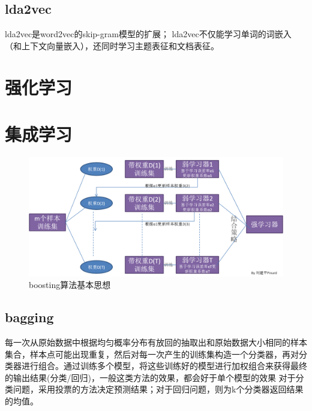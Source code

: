 \documentclass[UTF8]{article}%
\begin{document}
	\subsection{lda2vec}
	lda2vec是word2vec的skip-gram模型的扩展；
	lda2vec不仅能学习单词的词嵌入（和上下文向量嵌入），还同时学习主题表征和文档表征。
	
	\newpage
	\section{强化学习}
	\newpage
	\section{集成学习}
		\begin{figure}[h]%
			\centering  %
			\includegraphics[width=1.0\linewidth]{figures/adaboost}  %
			\caption{boosting算法基本思想}  %
			\label{boosting}   %
		\end{figure}
		\subsection{bagging}
		每一次从原始数据中根据均匀概率分布有放回的抽取出和原始数据大小相同的样本集合，样本点可能出现重复，然后对每一次产生的训练集构造一个分类器，再对分类器进行组合。通过训练多个模型，将这些训练好的模型进行加权组合来获得最终的输出结果(分类/回归)，一般这类方法的效果，都会好于单个模型的效果
		对于分类问题，采用投票的方法决定预测结果；对于回归问题，则为k个分类器返回结果的均值。
\end{document}
